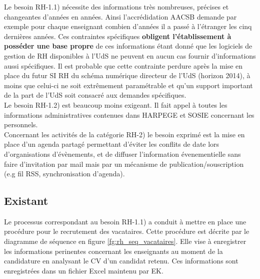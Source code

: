 \documentclass{book}
\begin{document}
\bigskip

Le besoin RH-1.1) nécessite des informations très nombreuses, précises
et changeantes d'années en années. Ainsi l'accrédidation AACSB demande
par exemple pour chaque enseignant combien d'années il a passé à l'étranger 
les cinq dernières années. Ces contraintes spécifiques \textbf{obligent 
l'établissement à posséder une base propre} de ces informations étant donné 
que les logiciels de gestion de RH disponibles à l'UdS ne peuvent en aucun
cas fournir d'informations aussi spécifiques. Il est probable que cette
contrainte perdure après la mise en place du futur SI RH du schéma numérique
directeur de l'UdS (horizon 2014), à moins que celui-ci ne soit extrêmement 
paramétrable et qu'un support important de la part de l'UdS soit consacré 
aux demandes spécifiques.\\

Le besoin RH-1.2) est beaucoup moins exigeant. Il fait appel à toutes
les informations administratives contenues dans HARPEGE et SOSIE
concernant les personnels.\\


Concernant les activités de la catégorie RH-2) le besoin exprimé 
est la mise en place d'un agenda partagé permettant d'éviter
les conflits de date lors d'organisations d'évènements, et de 
diffuser l'information évenementielle sans faire d'invitation
par mail mais par un mécanisme de publication/souscription
(e.g fil RSS, synchronisation d'agenda).  



\subsection{Existant}

Le processus correspondant au besoin RH-1.1) a conduit à mettre en
place une procédure pour le recrutement des vacataires. Cette procédure
est décrite par le diagramme de séquence en figure \ref{fg:rh_seq_vacataires}.
Elle vise à enregistrer les informations perinentes concernant les enseignants
au moment de la candidature en analysant le CV d'un candidat retenu. Ces
informations sont enregistrées dans un fichier Excel maintenu par EK.
\end{document}
